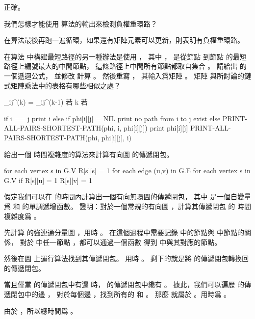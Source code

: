 \startANSWER
正確。
\stopANSWER

\startEXERCISE
我們怎樣才能使用  算法的輸出來檢測負權重環路？
\stopEXERCISE

\startANSWER
在算法最後再跑一遍循環，如果還有矩陣元素可以更新，則表明有負權重環路。
\stopANSWER

\startEXERCISE
在算法  中構建最短路徑的另一種辦法是使用 ，
其中 ，
  是從節點  到節點  的最短路徑上編號最大的中間節點，
這條路徑上中間所有節點都取自集合 。
請給出  的一個遞迴公式，
並修改  計算 。
然後重寫 ，
其輸入爲矩陣 。
矩陣 \m{\Phi} 與\insection[15.2] 所討論的鏈式矩陣乘法中的表格有哪些相似之處？
\stopEXERCISE

\startANSWER
\startformula
\phi_{ij}^{(k)} = \startcases
\NC \phi_{ij}^{(k-1)} \NC 若  \NR
\NC k \NC 若  \NR
\stopcases
\stopformula

\startCLRS
if i == j
	print i
else if phi[i][j] = NIL
	print no path from i to j exist
else
	PRINT-ALL-PAIRS-SHORTEST-PATH(phi, i, phi[i][j])
	print phi[i][j]
	PRINT-ALL-PAIRS-SHORTEST-PATH(phi, phi[i][j], i)
\stopCLRS
\stopANSWER

\startEXERCISE
給出一個  時間複雜度的算法來計算有向圖  的傳遞閉包。
\stopEXERCISE

\startANSWER
\startCLRS
for each vertex s in G.V
	R[s][s] = 1
for each edge (u,v) in G.E
	for each vertex s in G.V
		if R[s][u] = 1
			R[s][v] = 1
\stopCLRS
\stopANSWER

\startEXERCISE
假定我們可以在  的時間內計算出一個有向無環圖的傳遞閉包，
其中  是一個自變量爲  和  的單調遞增函數。
證明：對於一個常規的有向圖 ，計算其傳遞閉包  的
時間複雜度爲 。
\stopEXERCISE

\startANSWER
先計算  的強連通分量圖 ，用時 。
在這個過程中需要記錄  中的節點與  中節點的關係，
對於  中任一節點 ，都可以通過一個函數  得到  中與其對應的節點。

然後在圖  上運行算法找到其傳遞閉包。
用時 。
剩下的就是將  的傳遞閉包轉換回  的傳遞閉包。

當且僅當  的傳遞閉包中有邊  時，
  的傳遞閉包中纔有 。
據此，我們可以遍歷  的傳遞閉包中的邊 ，
對於每個邊 ，找到所有的  和 。
那麼  就屬於 。用時爲 。

由於 ，所以總時間爲 。
\stopANSWER

\stopsection

